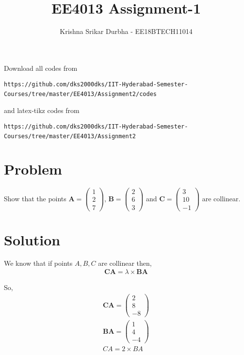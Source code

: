 \documentclass[journal,12pt,twocolumn]{IEEEtran}
\begin{document}
\def\putbox#1#2#3{\makebox[0in][l]{\makebox[#1][l]{}\raisebox{\baselineskip}[0in][0in]{\raisebox{#2}[0in][0in]{#3}}}}
     \def\rightbox#1{\makebox[0in][r]{#1}}
     \def\centbox#1{\makebox[0in]{#1}}
     \def\topbox#1{\raisebox{-\baselineskip}[0in][0in]{#1}}
     \def\midbox#1{\raisebox{-0.5\baselineskip}[0in][0in]{#1}}
\vspace{3cm}
\title{EE4013 Assignment-1}
\author{Krishna Srikar Durbha - EE18BTECH11014}
\maketitle
\newpage
\bigskip
\renewcommand{\thefigure}{\theenumi}
\renewcommand{\thetable}{\theenumi}
Download all codes from 
\begin{lstlisting}
https://github.com/dks2000dks/IIT-Hyderabad-Semester-Courses/tree/master/EE4013/Assignment2/codes
\end{lstlisting}
%
and latex-tikz codes from 
%
\begin{lstlisting}
https://github.com/dks2000dks/IIT-Hyderabad-Semester-Courses/tree/master/EE4013/Assignment2
\end{lstlisting}
\section{Problem}
Show that the points $\textbf{A} = \begin{pmatrix} 1 \\ 2 \\ 7 \end{pmatrix}$, $\textbf{B} = \begin{pmatrix} 2 \\ 6 \\ 3 \end{pmatrix}$ and $\textbf{C} = \begin{pmatrix} 3 \\ 10 \\ -1 \end{pmatrix}$ are collinear.

\section{Solution}
We know that if points $A,B,C$ are collinear then,
\begin{align}
\textbf{CA} = \lambda \times \textbf{BA}
\end{align}

So,
\begin{align}
\textbf{CA} = \begin{pmatrix} 2 \\ 8 \\ -8 \end{pmatrix} \\
\textbf{BA} = \begin{pmatrix} 1 \\ 4 \\ -4 \end{pmatrix} \\
CA = 2 \times BA
\end{align}
\end{document}
